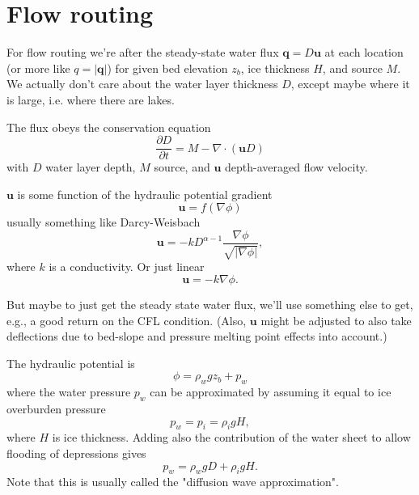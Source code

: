 \documentclass[DIV=13,halfparskip,11pt,headinclude]{scrartcl}
\author{Mauro A Werder}
\date{\today}
\title{}
\begin{document}
\section{Flow routing}
\label{sec:org5e20d4b}

For flow routing we're after the steady-state water flux \(\mathbf{q}=D
\mathbf{u}\) at each location (or more like \(q=|\mathbf{q}|\)) for given bed elevation \(z_b\), ice
thickness \(H\), and source \(M\).  We actually don't care about the water
layer thickness \(D\), except maybe where it is large, i.e. where there
are lakes.

The flux obeys the conservation equation
\begin{equation}
\frac{\partial D}{\partial t} = M - \nabla \cdot (\mathbf{u} D)
\end{equation}
with \(D\) water layer depth, \(M\) source, and \(\mathbf{u}\) depth-averaged flow
velocity.

\(\mathbf{u}\) is some function of the hydraulic potential gradient
\begin{equation}
 \mathbf{u} = f(\nabla \phi)
\end{equation}
usually something like Darcy-Weisbach
\begin{equation}
 \mathbf{u} = -k D^{\alpha-1}\frac{\nabla \phi}{\sqrt{|\nabla
\phi|}},
\end{equation}
where \(k\) is a conductivity. Or just linear
\begin{equation}
 \mathbf{u} = -k \nabla \phi.
\end{equation}

But maybe to just get the
steady state water flux, we'll use something else to get, e.g., a good return
on the CFL condition. (Also, \(\mathbf{u}\) might be adjusted to also take
deflections due to bed-slope and pressure melting point effects into account.)

The hydraulic potential is
\begin{equation}
  \label{eq:phi}
\phi = \rho_w g z_b + p_w
\end{equation}
where the water pressure \(p_w\) can be approximated by assuming it
equal to ice overburden pressure
\begin{equation}
  \label{eq:shreve}
  p_w= p_i = \rho_i g H,
\end{equation}
where \(H\) is ice thickness.
Adding also the contribution of the water
sheet to allow flooding of depressions gives
\begin{equation}
  p_w =  \rho_w g D + \rho_i g H.
\end{equation}
Note that this is usually
called the "diffusion wave approximation".
\end{document}
